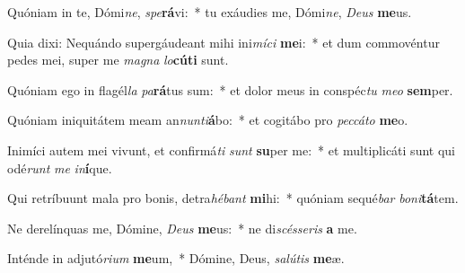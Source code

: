 \item Quóniam in te, Dómi\textit{ne}, \textit{spe}\textbf{rá}vi:~* tu exáudies me, Dómi\textit{ne}, \textit{De}\textit{us} \textbf{me}us.
\item Quia dixi: Nequándo supergáudeant mihi ini\textit{mí}\textit{ci} \textbf{me}i:~* et dum commovéntur pedes mei, super me \textit{ma}\textit{gna} \textit{lo}\textbf{cú}\textbf{ti} sunt.
\item Quóniam ego in flagél\textit{la} \textit{pa}\textbf{rá}tus sum:~* et dolor meus in conspéc\textit{tu} \textit{me}\textit{o} \textbf{sem}per.
\item Quóniam iniquitátem meam an\textit{nun}\textit{ti}\textbf{á}bo:~* et cogitábo pro \textit{pec}\textit{cá}\textit{to} \textbf{me}o.
\item Inimíci autem mei vivunt, et confirmá\textit{ti} \textit{sunt} \textbf{su}per me:~* et multiplicáti sunt qui odé\textit{runt} \textit{me} \textit{in}\textbf{í}que.
\item Qui retríbuunt mala pro bonis, detra\textit{hé}\textit{bant} \textbf{mi}hi:~* quóniam sequé\textit{bar} \textit{bo}\textit{ni}\textbf{tá}tem.
\item Ne derelínquas me, Dómine, \textit{De}\textit{us} \textbf{me}us:~* ne di\textit{scés}\textit{se}\textit{ris} \textbf{a} me.
\item Inténde in adjutó\textit{ri}\textit{um} \textbf{me}um,~* Dómine, Deus, \textit{sa}\textit{lú}\textit{tis} \textbf{me}æ.
